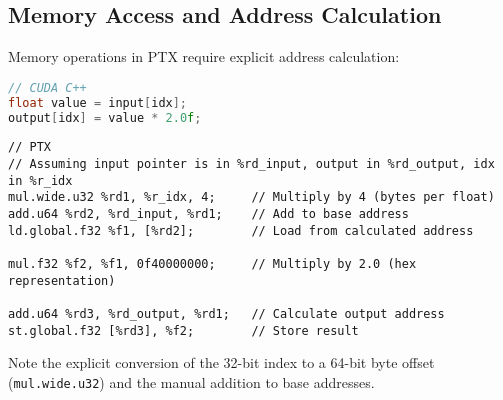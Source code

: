 \subsection{Memory Access and Address Calculation}

Memory operations in PTX require explicit address calculation:

\begin{lstlisting}[language=C++]
// CUDA C++
float value = input[idx];
output[idx] = value * 2.0f;
\end{lstlisting}

\begin{lstlisting}[style=ptx]
// PTX
// Assuming input pointer is in %rd_input, output in %rd_output, idx in %r_idx
mul.wide.u32 %rd1, %r_idx, 4;     // Multiply by 4 (bytes per float)
add.u64 %rd2, %rd_input, %rd1;    // Add to base address
ld.global.f32 %f1, [%rd2];        // Load from calculated address

mul.f32 %f2, %f1, 0f40000000;     // Multiply by 2.0 (hex representation)

add.u64 %rd3, %rd_output, %rd1;   // Calculate output address
st.global.f32 [%rd3], %f2;        // Store result
\end{lstlisting}

Note the explicit conversion of the 32-bit index to a 64-bit byte offset (\texttt{mul.wide.u32}) and the manual addition to base addresses.

